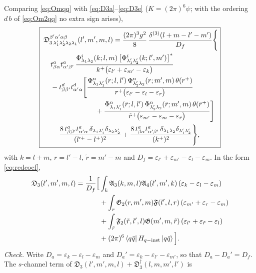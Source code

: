 \documentclass[11pt,a4paper]{article}
\numberwithin{equation}{section}
\newcommand{\mf}[1]{\mathfrak{#1}}
\newcommand{\eps}{\varepsilon}
\newcommand{\dg}{\dagger}
\newcommand{\dthree}{\delta^{(3)}}
\newcommand{\ket}[1]{\left|#1\right\rangle}
\newcommand{\bra}[1]{\left\langle#1\right|}
\newcommand{\Ph}{\Phi}
\begin{document}
Comparing \eqref{eq:Omqq} with \eqref{eq:D3a}--\eqref{eq:D3e} ($K=(2\pi)^{6}\psi$; with the ordering
$d\,b$ of \eqref{eq:Om2qq} no extra sign arises),
{\small
\begin{equation}
\boxed{\;
\begin{aligned}
&\mf D^{\beta'\alpha'\alpha\beta}_{3\,\lambda_{1}'\lambda_{2}'\lambda_{2}\lambda_{1}}(l',m',m,l)
=\frac{(2\pi)^{3}g^{2}}{8}\,\frac{\dthree(l+m-l'-m')}{D_{f}}\Bigg\{
\\&\quad
t^{a}_{\beta\alpha}t^{a}_{\alpha'\beta'}\,
\frac{\Ph^{i}_{\lambda_{1}\lambda_{2}}(k;l,m)\,\big[\Ph^{i}_{\lambda_{1}'\lambda_{2}'}(k;l',m')\big]^{*}}
{k^{+}\big(\eps_{l'}+\eps_{m'}-\eps_{k}\big)}
\\
&\quad-t^{d}_{\beta\beta'}t^{d}_{\alpha'\alpha}\Bigg[
\frac{\Ph^{n}_{\lambda_{1}\lambda_{1}'}(r;l,l')\,\Ph^{n}_{\lambda_{2}'\lambda_{2}}(r;m',m)\,\theta(r^{+})}
{r^{+}\big(\eps_{l'}-\eps_{l}-\eps_{r}\big)}
\\&\hspace{2.6cm}+\frac{\Ph^{n}_{\lambda_{1}\lambda_{1}'}(\tilde r;l,l')\,\Ph^{n}_{\lambda_{2}'\lambda_{2}}(\tilde r;m',m)\,\theta(\tilde r^{+})}
{\tilde r^{+}\big(\eps_{m'}-\eps_{m}-\eps_{\tilde r}\big)}\Bigg]
\\
&\quad-\frac{8\,t^{a}_{\beta\beta'}t^{a}_{\alpha'\alpha}\,\delta_{\lambda_{1}\lambda_{1}'}\delta_{\lambda_{2}\lambda_{2}'}}{(l'^{+}-l^{+})^{2}}
+\frac{8\,t^{a}_{\beta\alpha}t^{a}_{\alpha'\beta'}\,\delta_{\lambda_{1}\lambda_{2}}\delta_{\lambda_{1}'\lambda_{2}'}}{(k^{+})^{2}}\Bigg\},
\end{aligned}}
\label{eq:D3}
\end{equation}}
with $k=l+m$, $r=l'-l$, $\tilde r=m'-m$ and $D_{f}=\eps_{l'}+\eps_{m'}-\eps_{l}-\eps_{m}$. In the form
\eqref{eq:redcoef},
\begin{align}
\mf D_{3}(l',m',m,l)=\frac{1}{D_{f}}\Big[&\int_{k}\mf A_{3}(k,m,l)\mf A_{4}(l',m',k)\,(\eps_{k}-\eps_{l}-\eps_{m})
\nonumber\\&+\int_{r}\mf G_{2}(r,m',m)\mf F(l',l,r)\,(\eps_{m'}+\eps_{r}-\eps_{m})
\nonumber\\
&+\int_{\tilde r}\mf F_{2}(\tilde r,l',l)\mf G(m',m,\tilde r)\,(\eps_{l'}+\eps_{\tilde r}-\eps_{l})
\nonumber\\&+(2\pi)^{6}\bra{q\bar q}H_{q-{\rm inst}}\ket{q\bar q}\Big].
\label{eq:D3red}
\end{align}
\emph{Check.} Write $D_{a}=\eps_{k}-\eps_{l}-\eps_{m}$ and $D_{a}'=\eps_{k}-\eps_{l'}-\eps_{m'}$, so that
$D_{a}-D_{a}'=D_{f}$. The $s$-channel term of $\mf D_{3}(l',m',m,l)+\mf D_{3}^{\dg}(l,m,m',l')$ is
\end{document}
